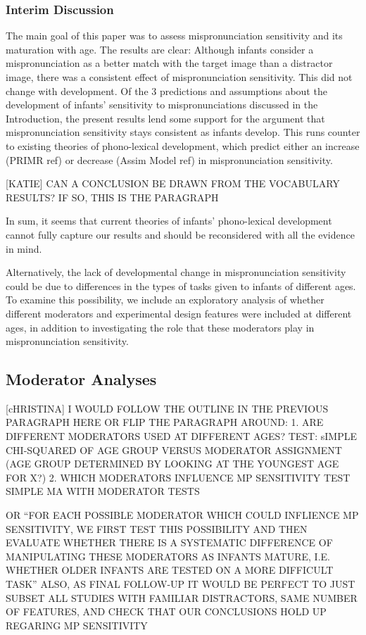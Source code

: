 \documentclass[man]{apa6}
\theoremstyle{definition}
\theoremstyle{definition}
\theoremstyle{definition}
\theoremstyle{remark}
\begin{document}
\subsubsection{Interim Discussion}\label{interim-discussion}

The main goal of this paper was to assess mispronunciation sensitivity
and its maturation with age. The results are clear: Although infants
consider a mispronunciation as a better match with the target image than
a distractor image, there was a consistent effect of mispronunciation
sensitivity. This did not change with development. Of the 3 predictions
and assumptions about the development of infants' sensitivity to
mispronunciations discussed in the Introduction, the present results
lend some support for the argument that mispronunciation sensitivity
stays consistent as infants develop. This runs counter to existing
theories of phono-lexical development, which predict either an increase
(PRIMR ref) or decrease (Assim Model ref) in mispronunciation
sensitivity.

{[}KATIE{]} CAN A CONCLUSION BE DRAWN FROM THE VOCABULARY RESULTS? IF
SO, THIS IS THE PARAGRAPH

In sum, it seems that current theories of infants' phono-lexical
development cannot fully capture our results and should be reconsidered
with all the evidence in mind.

Alternatively, the lack of developmental change in mispronunciation
sensitivity could be due to differences in the types of tasks given to
infants of different ages. To examine this possibility, we include an
exploratory analysis of whether different moderators and experimental
design features were included at different ages, in addition to
investigating the role that these moderators play in mispronunciation
sensitivity.

\subsection{Moderator Analyses}\label{moderator-analyses}

{[}cHRISTINA{]} I WOULD FOLLOW THE OUTLINE IN THE PREVIOUS PARAGRAPH
HERE OR FLIP THE PARAGRAPH AROUND: 1. ARE DIFFERENT MODERATORS USED AT
DIFFERENT AGES? TEST: sIMPLE CHI-SQUARED OF AGE GROUP VERSUS MODERATOR
ASSIGNMENT (AGE GROUP DETERMINED BY LOOKING AT THE YOUNGEST AGE FOR X?)
2. WHICH MODERATORS INFLUENCE MP SENSITIVITY TEST SIMPLE MA WITH
MODERATOR TESTS

OR \enquote{FOR EACH POSSIBLE MODERATOR WHICH COULD INFLIENCE MP
SENSITIVITY, WE FIRST TEST THIS POSSIBILITY AND THEN EVALUATE WHETHER
THERE IS A SYSTEMATIC DIFFERENCE OF MANIPULATING THESE MODERATORS AS
INFANTS MATURE, I.E. WHETHER OLDER INFANTS ARE TESTED ON A MORE
DIFFICULT TASK} ALSO, AS FINAL FOLLOW-UP IT WOULD BE PERFECT TO JUST
SUBSET ALL STUDIES WITH FAMILIAR DISTRACTORS, SAME NUMBER OF FEATURES,
AND CHECK THAT OUR CONCLUSIONS HOLD UP REGARING MP SENSITIVITY
\end{document}
